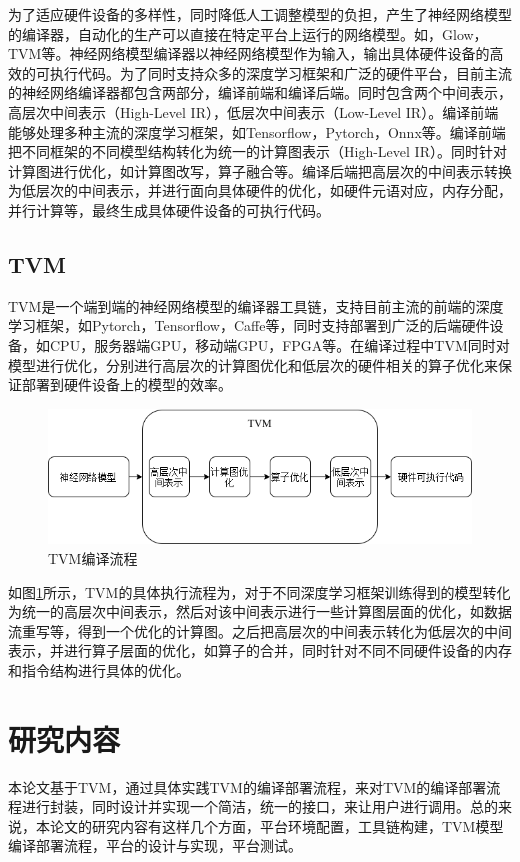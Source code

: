为了适应硬件设备的多样性，同时降低人工调整模型的负担，产生了神经网络模型的编译器，自动化的生产可以直接在特定平台上运行的网络模型。如，Glow，TVM等。神经网络模型编译器以神经网络模型作为输入，输出具体硬件设备的高效的可执行代码。为了同时支持众多的深度学习框架和广泛的硬件平台，目前主流的神经网络编译器都包含两部分，编译前端和编译后端。同时包含两个中间表示，高层次中间表示（High-Level IR），低层次中间表示（Low-Level IR）。编译前端能够处理多种主流的深度学习框架，如Tensorflow，Pytorch，Onnx等。编译前端把不同框架的不同模型结构转化为统一的计算图表示（High-Level IR）。同时针对计算图进行优化，如计算图改写，算子融合等。编译后端把高层次的中间表示转换为低层次的中间表示，并进行面向具体硬件的优化，如硬件元语对应，内存分配，并行计算等，最终生成具体硬件设备的可执行代码。

\subsection{TVM}

TVM是一个端到端的神经网络模型的编译器工具链，支持目前主流的前端的深度学习框架，如Pytorch，Tensorflow，Caffe等，同时支持部署到广泛的后端硬件设备，如CPU，服务器端GPU，移动端GPU，FPGA等。在编译过程中TVM同时对模型进行优化，分别进行高层次的计算图优化和低层次的硬件相关的算子优化来保证部署到硬件设备上的模型的效率。

\begin{figure}[h!]
    \centering
    \includegraphics[width=270bp]{figure/tvm_overview.png}
    \caption{TVM编译流程}
    \label{tvm_overivew}
\end{figure}

如图\ref{tvm_overivew}所示，TVM的具体执行流程为，对于不同深度学习框架训练得到的模型转化为统一的高层次中间表示，然后对该中间表示进行一些计算图层面的优化，如数据流重写等，得到一个优化的计算图。之后把高层次的中间表示转化为低层次的中间表示，并进行算子层面的优化，如算子的合并，同时针对不同不同硬件设备的内存和指令结构进行具体的优化。

\section{研究内容}

本论文基于TVM，通过具体实践TVM的编译部署流程，来对TVM的编译部署流程进行封装，同时设计并实现一个简洁，统一的接口，来让用户进行调用。总的来说，本论文的研究内容有这样几个方面，平台环境配置，工具链构建，TVM模型编译部署流程，平台的设计与实现，平台测试。

